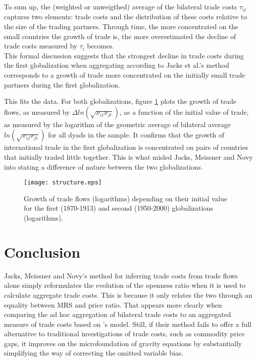 \documentclass{article}
\begin{document}
To sum up, the (weighted or unweigthed) average of the
bilateral trade costs $\tau_{ij}$ captures two elements: trade
costs and the distribution of these costs relative to the size
of the trading partners. Through time, the more concentrated on
the small countries the growth of trade is, the more
overestimated the
decline of trade costs measured by $\tau_i$ becomes.\\

This formal discussion suggests that the strongest decline in
trade costs during the first globalization when aggregating
according to Jacks et al.'s method corresponds to a growth of
trade more concentrated on the initially small trade partners
during the first globalization.

This fits the data. For both globalizations, figure
\ref{structure} plots the growth of trade flows, as measured by
$\Delta ln (\sqrt{x_{ij} x_{ji}})$, as a function of the
initial value of trade, as measured by the logarithm of the
geometric average of bilateral average $ln(\sqrt{x_{ij}
x_{ji}})$ for all dyads in the sample. It confirms that the
growth of international trade in the first globalization is
concentrated on pairs of countries that initially traded little
together. This is what misled Jacks, Meissner and Novy into
stating a difference of nature between the two globalizations.

\begin{figure}
\centering
\texttt{[image: structure.eps]}
\caption{Growth of trade flows (logarithms) depending on their initial value for the first (1870-1913) and second (1950-2000) globalizations (logarithms).}\label{structure}
\end{figure}

\section{\label{5} Conclusion}

Jacks, Meissner and Novy's method for inferring trade costs
from trade flows alone simply reformulates the evolution of the
openness ratio when it is used to calculate aggregate trade
costs. This is because it only relates the two through an
equality between MRS and price ratio. That appears more clearly
when comparing the ad hoc aggregation of bilateral trade costs
to an aggregated measure of trade costs based on
\cite{AW2003}'s model. Still, if their method fails to offer a
full alternative to traditional investigations of trade costs,
such as commodity price gaps, it improves on the
microfoundation of gravity equations by substantially
simplifying the way of correcting the omitted variable bias.
\end{document}
